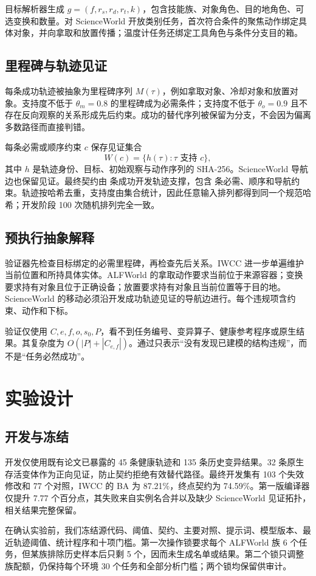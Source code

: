 \documentclass[10pt]{article}
\begin{document}
目标解析器生成 $g=(f,r_s,r_d,r_t,k)$，包含技能族、对象角色、目的地角色、可选变换和数量。对 ScienceWorld 开放类别任务，首次符合条件的聚焦动作绑定具体对象，并向拿取和放置传播；温度计任务还绑定工具角色与条件分支目的箱。

\subsection{里程碑与轨迹见证}
每条成功轨迹被抽象为里程碑序列 $M(\tau)$，例如拿取对象、冷却对象和放置对象。支持度不低于 $\theta_m=0.8$ 的里程碑成为必需条件；支持度不低于 $\theta_o=0.9$ 且不存在反向观察的关系形成先后约束。成功的替代序列被保留为分支，不会因为偏离多数路径而直接判错。

每条必需或顺序约束 $c$ 保存见证集合
\[
W(c)=\{h(\tau):\tau\text{ 支持 }c\},
\]
其中 $h$ 是轨迹身份、目标、初始观察与动作序列的 SHA-256。ScienceWorld 导航边也保留见证。最终契约由 \TraceCount{} 条成功开发轨迹支撑，包含 \ClauseCount{} 条必需、顺序和导航约束。轨迹按哈希去重，支持度由集合统计，因此任意输入排列都得到同一个规范哈希；开发阶段 100 次随机排列完全一致。

\subsection{预执行抽象解释}
验证器先检查目标绑定的必需里程碑，再检查先后关系。IWCC 进一步单遍维护当前位置和所持具体实体。ALFWorld 的拿取动作要求当前位于来源容器；变换要求持有对象且位于正确设备；放置要求持有对象且当前位置等于目的地。ScienceWorld 的移动必须沿开发成功轨迹见证的导航边进行。每个违规项含约束、动作和下标。

验证仅使用 $C,e,f,o,s_0,P$，看不到任务编号、变异算子、健康参考程序或原生结果。其复杂度为 $O(|P|+|C_{e,f}|)$。通过只表示“没有发现已建模的结构违规”，而不是“任务必然成功”。

\section{实验设计}
\subsection{开发与冻结}
开发仅使用既有论文已暴露的 45 条健康轨迹和 135 条历史变异结果。32 条原生存活变体作为正向见证，防止契约拒绝有效替代路径。最终开发集有 103 个失效修改和 77 个对照，IWCC 的 BA 为 87.21\%，终点契约为 74.59\%。第一版编译器仅提升 7.77 个百分点，其失败来自实例名合并以及缺少 ScienceWorld 见证拓扑，相关结果完整保留。

在确认实验前，我们冻结源代码、阈值、契约、主要对照、提示词、模型版本、最近轨迹阈值、统计程序和十项门槛。第一次操作锁要求每个 ALFWorld 族 6 个任务，但某族排除历史样本后只剩 5 个，因而未生成名单或结果。第二个锁只调整族配额，仍保持每个环境 30 个任务和全部分析门槛；两个锁均保留供审计。
\end{document}
